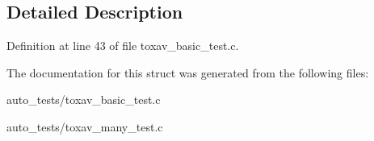 \subsection{Detailed Description}


Definition at line 43 of file toxav\+\_\+basic\+\_\+test.\+c.



The documentation for this struct was generated from the following files\+:\begin{DoxyCompactItemize}
\item 
auto\+\_\+tests/toxav\+\_\+basic\+\_\+test.\+c\item 
auto\+\_\+tests/toxav\+\_\+many\+\_\+test.\+c\end{DoxyCompactItemize}
